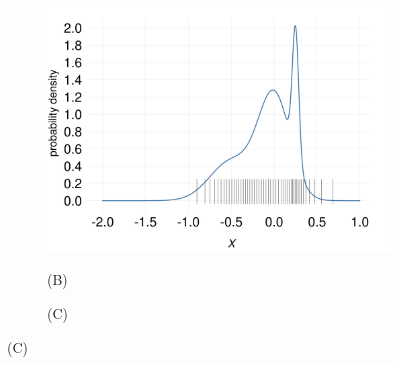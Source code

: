 \documentclass[
  a4paper,
  DIV=11,
  numbers=noendperiod,
  oneside]{scrreprt}
\begin{document}
\begin{figure}
\begin{tcolorbox}
\begin{figure}[H]
\begin{minipage}[t]{0.50\linewidth}
{{\includegraphics{example_scatter_densitya_p50.png}

}

\caption{(B)}

}

\end{minipage}%
\newline
\begin{minipage}[t]{0.50\linewidth}

{\centering 


\caption{(C)}

}

\end{minipage}%
%
\begin{minipage}[t]{0.50\linewidth}


\end{minipage}
\end{figure}
\end{tcolorbox}
\end{figure}
\end{document}
